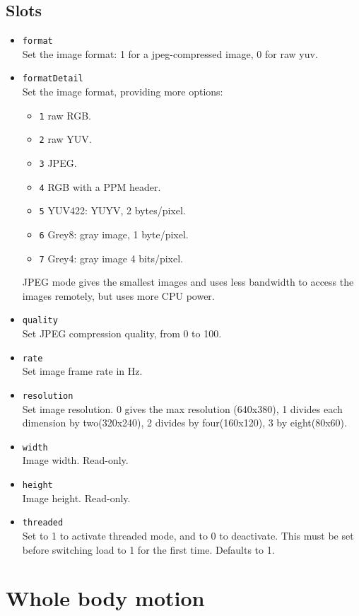 \subsection{Slots}
\begin{itemize}
\item \lstinline|format| \\
  Set the image format: 1 for a jpeg-compressed image, 0 for raw yuv.
\item \lstinline|formatDetail| \\
  Set the image format, providing more options:
  \begin{itemize}
  \item \lstinline|1| raw RGB.
  \item \lstinline|2| raw YUV.
  \item \lstinline|3| JPEG.
  \item \lstinline|4| RGB with a PPM header.
  \item \lstinline|5| YUV422:  YUYV, 2 bytes/pixel.
  \item \lstinline|6| Grey8: gray image, 1 byte/pixel.
  \item \lstinline|7| Grey4: gray image 4 bits/pixel.
  \end{itemize}
  JPEG mode gives the smallest images and uses less bandwidth to access the
  images remotely, but uses more CPU power.
\item \lstinline|quality| \\
  Set JPEG compression quality, from 0 to 100.
\item \lstinline|rate| \\
  Set image frame rate in Hz.
\item \lstinline|resolution| \\
  Set image resolution.  0 gives the max resolution (640x380), 1 divides each
  dimension by two(320x240), 2 divides by four(160x120), 3 by eight(80x60).
\item \lstinline|width| \\
  Image width. Read-only.
\item \lstinline|height| \\
  Image height. Read-only.
\item \lstinline|threaded| \\
  Set to 1 to activate threaded mode, and to 0 to deactivate. This must be set
  before switching load to 1 for the first time. Defaults to 1.
\end{itemize}

\section{Whole body motion}

